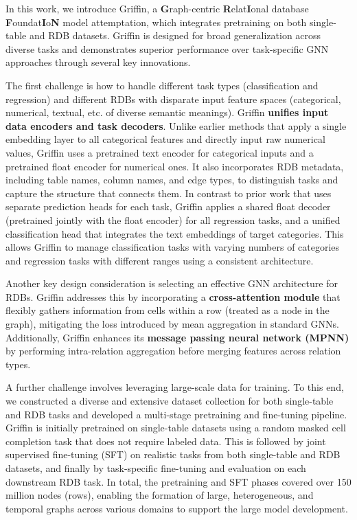 \documentclass{article}
\theoremstyle{plain}
\theoremstyle{definition}
\theoremstyle{remark}
\begin{document}
In this work, we introduce Griffin, a \textbf{G}raph-centric \textbf{R}elat\textbf{I}onal database \textbf{F}oundat\textbf{I}o\textbf{N} model attemptation, which integrates pretraining on both single-table and RDB datasets. Griffin is designed for broad generalization across diverse tasks and demonstrates superior performance over task-specific GNN approaches through several key innovations.

The first challenge is how to handle different task types (classification and regression) and different RDBs with disparate input feature spaces (categorical, numerical, textual, etc. of diverse semantic meanings). Griffin \textbf{unifies input data encoders and task decoders}. Unlike earlier methods that apply a single embedding layer to all categorical features and directly input raw numerical values, Griffin uses a pretrained text encoder for categorical inputs and a pretrained float encoder for numerical ones. It also incorporates RDB metadata, including table names, column names, and edge types, to distinguish tasks and capture the structure that connects them. In contrast to prior work that uses separate prediction heads for each task, Griffin applies a shared float decoder (pretrained jointly with the float encoder) for all regression tasks, and a unified classification head that integrates the text embeddings of target categories. This allows Griffin to manage classification tasks with varying numbers of categories and regression tasks with different ranges using a consistent architecture.

Another key design consideration is selecting an effective GNN architecture for RDBs. Griffin addresses this by incorporating a \textbf{cross-attention module} that flexibly gathers information from cells within a row (treated as a node in the graph), mitigating the loss introduced by mean aggregation in standard GNNs. Additionally, Griffin enhances its \textbf{message passing neural network (MPNN)} by performing intra-relation aggregation before merging features across relation types.

A further challenge involves leveraging large-scale data for training. To this end, we constructed a diverse and extensive dataset collection for both single-table and RDB tasks and developed a multi-stage pretraining and fine-tuning pipeline. Griffin is initially pretrained on single-table datasets using a random masked cell completion task that does not require labeled data. This is followed by joint supervised fine-tuning (SFT) on realistic tasks from both single-table and RDB datasets, and finally by task-specific fine-tuning and evaluation on each downstream RDB task. In total, the pretraining and SFT phases covered over 150 million nodes (rows), enabling the formation of large, heterogeneous, and temporal graphs across various domains to support the large model development.
\end{document}

